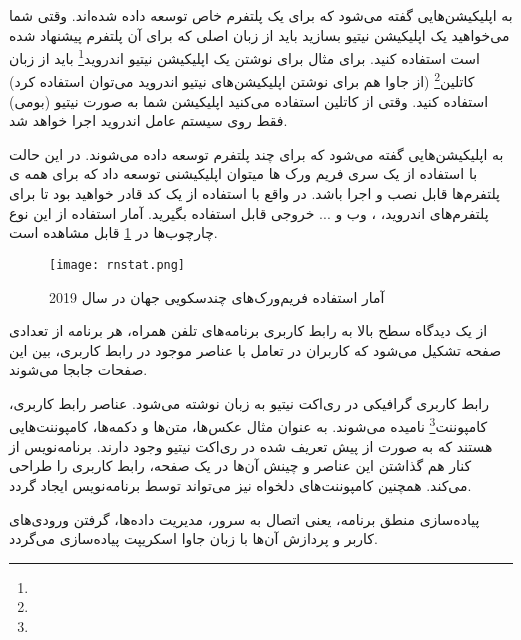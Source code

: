 به اپلیکیشن‌هایی گفته می‌شود که برای یک پلتفرم خاص توسعه داده شده‌اند. وقتی شما می‌خواهید یک اپلیکیشن نیتیو بسازید باید از زبان اصلی که برای آن پلتفرم پیشنهاد شده است استفاده کنید. برای مثال برای نوشتن یک اپلیکیشن نیتیو اندروید\footnote{} باید از زبان کاتلین\footnote{} (از جاوا هم برای نوشتن اپلیکیشن‌های نیتیو اندروید می‌توان استفاده کرد) استفاده کنید. وقتی از کاتلین استفاده می‌کنید اپلیکیشن شما به صورت نیتیو (بومی) فقط روی سیستم عامل اندروید اجرا خواهد شد.


به اپلیکیشن‌هایی گفته می‌شود که برای چند پلتفرم توسعه داده می‌شوند.
در این حالت با استفاده از یک سری فریم ورک ها میتوان اپلیکیشنی توسعه داد که برای همه ی پلتفرم‌ها قابل نصب و اجرا باشد.
در واقع با استفاده از یک کد قادر خواهید بود تا برای پلتفرم‌های اندروید، ، وب و ... خروجی قابل استفاده بگیرید.
آمار استفاده از این نوع چارچوب‌ها در \cref{fig:rnstat} قابل مشاهده است.

\begin{figure}[h!]
	\centering
	\texttt{[image: rnstat.png]}
	\caption{آمار استفاده فریم‌ورک‌های چندسکویی جهان در سال 2019\cite{react:crossplatform}}
	\label{fig:rnstat}
\end{figure}



از یک دیدگاه سطح بالا به رابط کاربری برنامه‌های تلفن همراه، هر برنامه از تعدادی صفحه تشکیل می‌شود که کاربران در تعامل با عناصر موجود در رابط کاربری، بین این صفحات جابجا می‌شوند‌\cite{wiki:react}.

رابط کاربری گرافیکی در ری‌اکت نیتیو به زبان  نوشته می‌شود. عناصر رابط کاربری، کامپوننت\footnote{} نامیده می‌شوند. به عنوان مثال عکس‌ها، متن‌ها و دکمه‌ها، کامپوننت‌هایی هستند که به صورت از پیش تعریف شده در ری‌اکت نیتیو وجود دارند. برنامه‌نویس از کنار هم گذاشتن این عناصر و چینش آن‌ها در یک صفحه، رابط کاربری را طراحی می‌کند. همچنین کامپوننت‌های دلخواه نیز می‌تواند توسط برنامه‌نویس ایجاد گردد.

پیاده‌سازی منطق برنامه، یعنی اتصال به سرور، مدیریت داده‌ها، گرفتن ورودی‌های کاربر و پردازش آن‌ها با زبان جاوا اسکریپت پیاده‌سازی می‌گردد.



